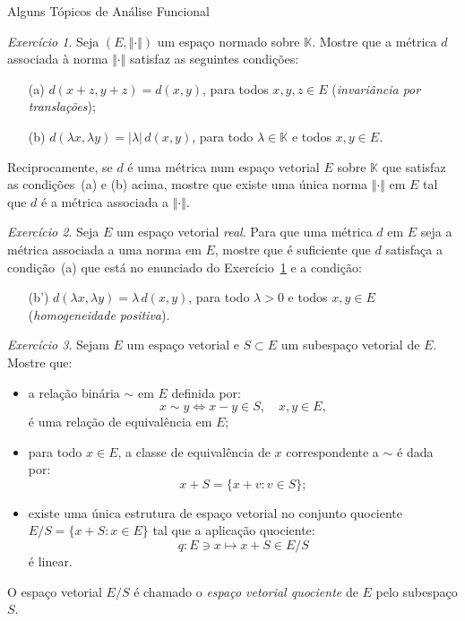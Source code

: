 \documentclass[oneside,final,11pt]{amsbook}
\newcommand{\K}{\mathds K}
\theoremstyle{remark}\newtheorem{exercise}{Exercício}[chapter]
\theoremstyle{remark}\newtheorem{*exercise}[exercise]{\hbox to 0pt{\hskip 0pt minus 1fil*}Exercício}
\theoremstyle{definition}\newtheorem{exdefin}{Definição}[chapter]
\theoremstyle{plain}\newtheorem{teo}{Teorema}[section]
\theoremstyle{plain}\newtheorem{lem}[teo]{Lema}
\theoremstyle{plain}\newtheorem{prop}[teo]{Proposição}
\theoremstyle{plain}\newtheorem{cor}[teo]{Corolário}
\theoremstyle{definition}\newtheorem{defin}[teo]{Definição}
\theoremstyle{remark}\newtheorem{rem}[teo]{Observação}
\theoremstyle{definition}\newtheorem{notation}[teo]{Notação}
\theoremstyle{definition}\newtheorem{convention}[teo]{Convenção}
\theoremstyle{definition}\newtheorem{example}[teo]{Exemplo}
\numberwithin{section}{chapter}
\numberwithin{equation}{section}
\begin{document}
\begin{chapter}{Alguns Tópicos de Análise Funcional}
\begin{exercise}\label{exe:metricanorma}
Seja $(E,\Vert\cdot\Vert)$ um espaço normado sobre $\K$. Mostre que a métrica $d$ associada à norma $\Vert\cdot\Vert$ satisfaz
as seguintes condições:
\begin{itemize}
\item[(a)] $d(x+z,y+z)=d(x,y)$, para todos $x,y,z\in E$ ({\em invariância por translações});%
\item[(b)] $d(\lambda x,\lambda y)=\vert\lambda\vert\,d(x,y)$, para todo $\lambda\in\K$ e todos $x,y\in E$.
\end{itemize}
Reciprocamente, se $d$ é uma métrica num espaço vetorial $E$ sobre $\K$ que satisfaz as condições~(a) e (b) acima,
mostre que existe uma única norma $\Vert\cdot\Vert$ em $E$ tal que $d$ é a métrica associada a $\Vert\cdot\Vert$.
\end{exercise}

\begin{exercise}
Seja $E$ um espaço vetorial {\em real}. Para que uma métrica $d$ em $E$ seja a métrica associada
a uma norma em $E$, mostre que é suficiente que $d$ satisfaça a condição~(a) que está no enunciado do Exercício~\ref{exe:metricanorma}
e a condição:
\begin{itemize}
\item[(b')] $d(\lambda x,\lambda y)=\lambda\,d(x,y)$, para todo $\lambda>0$ e todos $x,y\in E$ ({\em homogeneidade positiva}).%
\end{itemize}
\end{exercise}

\begin{exercise}
Sejam $E$ um espaço vetorial e $S\subset E$ um subespaço vetorial de $E$. Mostre que:
\begin{itemize}
\item a relação binária $\sim$ em $E$ definida por:
\[x\sim y\Longleftrightarrow x-y\in S,\quad x,y\in E,\]
é uma relação de equivalência em $E$;
\item para todo $x\in E$, a classe de equivalência de $x$ correspondente a $\sim$ é dada por:
\[x+S=\big\{x+v:v\in S\big\};\]
\item existe uma única estrutura de espaço vetorial no conjunto quociente $E/S=\big\{x+S:x\in E\big\}$
tal que a aplicação quociente:
\[q:E\ni x\longmapsto x+S\in E/S\]
é linear.
\end{itemize}
O espaço vetorial $E/S$ é chamado o
{\em espaço vetorial quociente\/}
de $E$ pelo subespaço $S$.
\end{exercise}


\end{chapter}
\end{document}
